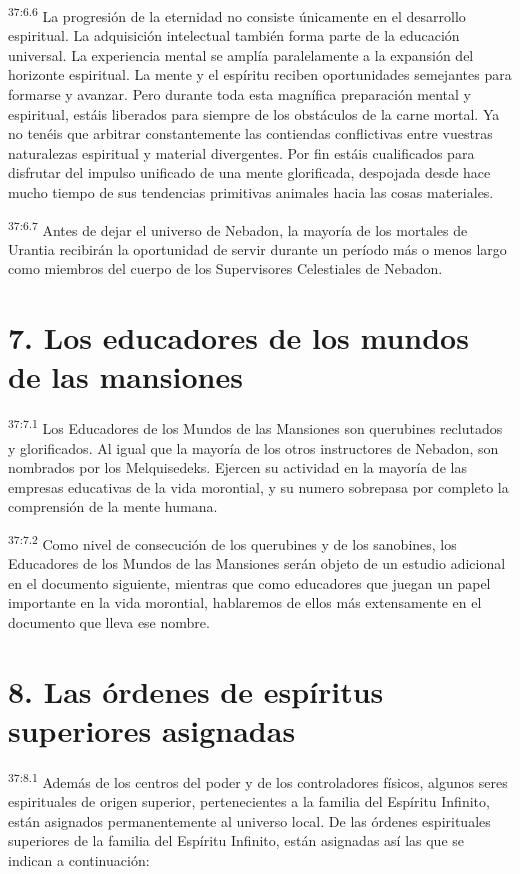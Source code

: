 \par
\textsuperscript{37:6.6} La progresión de la eternidad no consiste únicamente en el desarrollo espiritual. La adquisición intelectual también forma parte de la educación universal. La experiencia mental se amplía paralelamente a la expansión del horizonte espiritual. La mente y el espíritu reciben oportunidades semejantes para formarse y avanzar. Pero durante toda esta magnífica preparación mental y espiritual, estáis liberados para siempre de los obstáculos de la carne mortal. Ya no tenéis que arbitrar constantemente las contiendas conflictivas entre vuestras naturalezas espiritual y material divergentes. Por fin estáis cualificados para disfrutar del impulso unificado de una mente glorificada, despojada desde hace mucho tiempo de sus tendencias primitivas animales hacia las cosas materiales.

\par
\textsuperscript{37:6.7} Antes de dejar el universo de Nebadon, la mayoría de los mortales de Urantia recibirán la oportunidad de servir durante un período más o menos largo como miembros del cuerpo de los Supervisores Celestiales de Nebadon.

\section*{7. Los educadores de los mundos de las mansiones}
\par
\textsuperscript{37:7.1} Los Educadores de los Mundos de las Mansiones son querubines reclutados y glorificados. Al igual que la mayoría de los otros instructores de Nebadon, son nombrados por los Melquisedeks. Ejercen su actividad en la mayoría de las empresas educativas de la vida morontial, y su numero sobrepasa por completo la comprensión de la mente humana.

\par
\textsuperscript{37:7.2} Como nivel de consecución de los querubines y de los sanobines, los Educadores de los Mundos de las Mansiones serán objeto de un estudio adicional en el documento siguiente, mientras que como educadores que juegan un papel importante en la vida morontial, hablaremos de ellos más extensamente en el documento que lleva ese nombre.

\section*{8. Las órdenes de espíritus superiores asignadas}
\par
\textsuperscript{37:8.1} Además de los centros del poder y de los controladores físicos, algunos seres espirituales de origen superior, pertenecientes a la familia del Espíritu Infinito, están asignados permanentemente al universo local. De las órdenes espirituales superiores de la familia del Espíritu Infinito, están asignadas así las que se indican a continuación:

